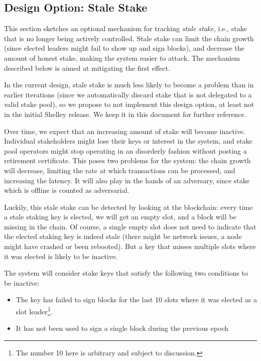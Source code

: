 \documentclass[11pt,a4paper]{article}
\begin{document}
\subsection{Design Option: Stale Stake}
\label{stale-stake}

This section sketches an optional mechanism for tracking \emph{stale
  stake}, i.e., stake that is no longer being actively
controlled. Stale stake can limit the chain growth (since elected
leaders might fail to show up and sign blocks), and decrease the
amount of honest stake, making the system easier to attack. The
mechanism described below is aimed at mitigating the first effect.

In the current design, stale stake is much less likely to become a
problem than in earlier iterations (since we automatically discard
stake that is not delegated to a valid stake pool), so we propose to
not implement this design option, at least not in the initial Shelley
release. We keep it in this document for further reference.

Over time, we expect that an increasing amount of stake will become
inactive. Individual stakeholders might lose their keys or interest in
the system, and stake pool operators might stop operating in an
disorderly fashion without posting a retirement certificate. This poses
two problems for the system: the chain growth will decrease, limiting
the rate at which transactions can be processed, and increasing the
latency. It will also play in the hands of an adversary, since stake
which is offline is counted as adversarial.

Luckily, this stale stake can be detected by looking at the blockchain:
every time a stale staking key is elected, we will get an empty slot,
and a block will be missing in the chain. Of course, a single empty slot
does not need to indicate that the elected staking key is indeed stale
(there might be network issues, a node might have crashed or been
rebooted). But a key that misses multiple slots where it was elected is
likely to be inactive.

The system will consider stake keys that satisfy the following two
conditions to be inactive:

\begin{itemize}
\item
  The key has failed to sign blocks for the last 10 slots where it was
  elected as a slot leader\footnote{The number 10 here is arbitrary and
    subject to discussion.}.
\item
  It has not been used to sign a single block during the previous epoch
\end{itemize}
\end{document}
